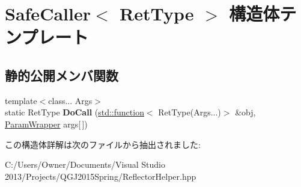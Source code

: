 \hypertarget{struct_safe_caller}{}\section{Safe\+Caller$<$ Ret\+Type $>$ 構造体テンプレート}
\label{struct_safe_caller}
\subsection*{静的公開メンバ関数}
\begin{DoxyCompactItemize}
\item 
{\footnotesize template$<$class... Args$>$ }\\static Ret\+Type {\bfseries Do\+Call} (\hyperlink{classstd_1_1function}{std\+::function}$<$ Ret\+Type(Args...)$>$ \&obj, \hyperlink{struct_param_wrapper}{Param\+Wrapper} args\mbox{[}$\,$\mbox{]})\hypertarget{struct_safe_caller_a0996600e3d6753cb675b186cbb394e60}{}\label{struct_safe_caller_a0996600e3d6753cb675b186cbb394e60}

\end{DoxyCompactItemize}


この構造体詳解は次のファイルから抽出されました\+:\begin{DoxyCompactItemize}
\item 
C\+:/\+Users/\+Owner/\+Documents/\+Visual Studio 2013/\+Projects/\+Q\+G\+J2015\+Spring/Reflector\+Helper.\+hpp\end{DoxyCompactItemize}

